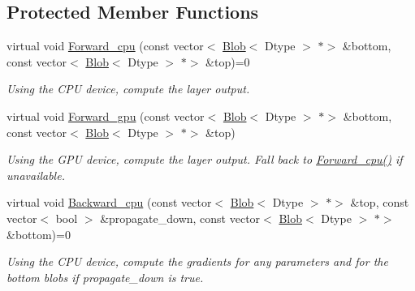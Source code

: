 \subsection*{Protected Member Functions}
\begin{DoxyCompactItemize}
\item 
\mbox{\label{classcaffe_1_1_layer_a576ac6a60b1e99fe383831f52a6cea77}} 
virtual void \mbox{\hyperlink{classcaffe_1_1_layer_a576ac6a60b1e99fe383831f52a6cea77}{Forward\+\_\+cpu}} (const vector$<$ \mbox{\hyperlink{classcaffe_1_1_blob}{Blob}}$<$ Dtype $>$ $\ast$$>$ \&bottom, const vector$<$ \mbox{\hyperlink{classcaffe_1_1_blob}{Blob}}$<$ Dtype $>$ $\ast$$>$ \&top)=0
\begin{DoxyCompactList}\small\item\em Using the C\+PU device, compute the layer output. \end{DoxyCompactList}\item 
\mbox{\label{classcaffe_1_1_layer_af3a88d8fb290877b4c7eb37daa3499de}} 
virtual void \mbox{\hyperlink{classcaffe_1_1_layer_af3a88d8fb290877b4c7eb37daa3499de}{Forward\+\_\+gpu}} (const vector$<$ \mbox{\hyperlink{classcaffe_1_1_blob}{Blob}}$<$ Dtype $>$ $\ast$$>$ \&bottom, const vector$<$ \mbox{\hyperlink{classcaffe_1_1_blob}{Blob}}$<$ Dtype $>$ $\ast$$>$ \&top)
\begin{DoxyCompactList}\small\item\em Using the G\+PU device, compute the layer output. Fall back to \mbox{\hyperlink{classcaffe_1_1_layer_a576ac6a60b1e99fe383831f52a6cea77}{Forward\+\_\+cpu()}} if unavailable. \end{DoxyCompactList}\item 
\mbox{\label{classcaffe_1_1_layer_a75c9b2a321dc713e0eaef530d02dc37f}} 
virtual void \mbox{\hyperlink{classcaffe_1_1_layer_a75c9b2a321dc713e0eaef530d02dc37f}{Backward\+\_\+cpu}} (const vector$<$ \mbox{\hyperlink{classcaffe_1_1_blob}{Blob}}$<$ Dtype $>$ $\ast$$>$ \&top, const vector$<$ bool $>$ \&propagate\+\_\+down, const vector$<$ \mbox{\hyperlink{classcaffe_1_1_blob}{Blob}}$<$ Dtype $>$ $\ast$$>$ \&bottom)=0
\begin{DoxyCompactList}\small\item\em Using the C\+PU device, compute the gradients for any parameters and for the bottom blobs if propagate\+\_\+down is true. \end{DoxyCompactList}\item 

\end{DoxyCompactItemize}
